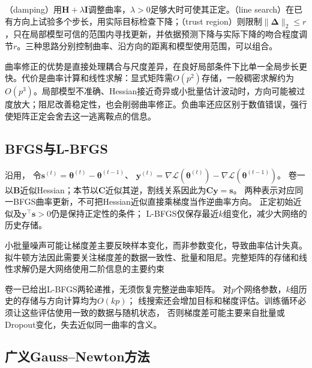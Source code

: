 （damping）用$\bm H+\lambda\bm I$调整曲率，$\lambda>0$足够大时可使其正定。（line search）在已有方向上试验多个步长，用实际目标检查下降；（trust region）则限制$\lVert\bm\Delta\rVert_2\leq r$，只在局部模型可信的范围内寻找更新，并依据预测下降与实际下降的吻合程度调节$r$。三种思路分别控制曲率、沿方向的距离和模型使用范围，可以组合。

曲率修正的优势是直接处理耦合与尺度差异，在良好局部条件下比单一全局步长更快。代价是曲率计算和线性求解：显式矩阵需$O(p^2)$存储，一般稠密求解约为$O(p^3)$。局部模型不准确、Hessian接近奇异或小批量估计波动时，方向可能被过度放大；阻尼改善稳定性，也会削弱曲率修正。负曲率还应区别于数值错误，强行使矩阵正定会舍去这一逃离鞍点的信息。

\subsection{BFGS与L-BFGS}
\label{sec:training-quasi-newton}

沿用，
令$\bm s^{(t)}=\bm\theta^{(t)}-\bm\theta^{(t-1)}$、
$\bm y^{(t)}=\nabla\mathcal L(\bm\theta^{(t)})-\nabla\mathcal L(\bm\theta^{(t-1)})$。
卷一以$\bm B$近似Hessian；本节以$\bm C$近似其逆，割线关系因此为$\bm C\bm y=\bm s$。
两种表示对应同一BFGS曲率更新，不可把Hessian近似直接乘梯度当作逆曲率方向。
正定初始近似及$\bm y^\top\bm s>0$仍是保持正定性的条件；
L-BFGS仅保存最近$k$组变化，减少大网络的历史存储。

小批量噪声可能让梯度差主要反映样本变化，而非参数变化，导致曲率估计失真。拟牛顿方法因此需要关注梯度差的数据一致性、批量和阻尼。完整矩阵的存储和线性求解仍是大网络使用二阶信息的主要约束

卷一已给出L-BFGS两轮递推，无须恢复完整逆曲率矩阵。
对$p$个网络参数，$k$组历史的存储与方向计算均为$O(kp)$；
线搜索还会增加目标和梯度评估。训练循环必须让这些评估使用一致的数据与随机状态，
否则梯度差可能主要来自批量或Dropout变化，失去近似同一曲率的含义。

\subsection{广义Gauss--Newton方法}
\label{sec:training-generalized-curvature}


